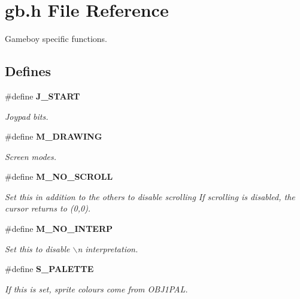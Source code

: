 \section{gb.h File Reference}
\label{gb.h}
Gameboy specific functions. 


\subsection*{Defines}
\begin{CompactItemize}
\item 
\#define {\bf J\_\-START}
\begin{CompactList}\small\item\em Joypad bits.\item\end{CompactList}

\item 
\#define {\bf M\_\-DRAWING}
\begin{CompactList}\small\item\em Screen modes.\item\end{CompactList}

\item 
\label{gb.h_a11}
\#define {\bf M\_\-NO\_\-SCROLL}
\begin{CompactList}\small\item\em Set this in addition to the others to disable scrolling If scrolling is disabled, the cursor returns to (0,0).\item\end{CompactList}

\item 
\label{gb.h_a12}
\#define {\bf M\_\-NO\_\-INTERP}
\begin{CompactList}\small\item\em Set this to disable $\backslash$n interpretation.\item\end{CompactList}

\item 
\#define {\bf S\_\-PALETTE}
\begin{CompactList}\small\item\em If this is set, sprite colours come from OBJ1PAL.\item\end{CompactList}


\end{CompactItemize}
